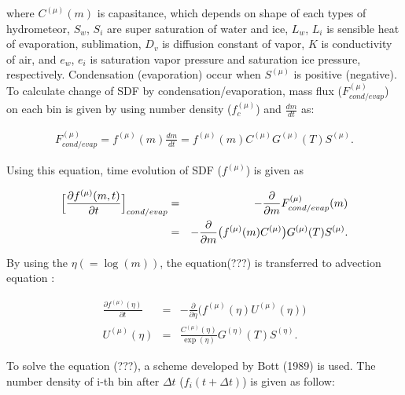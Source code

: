 where $C^{(\mu)}(m)$ is capasitance, which depends on shape of each types of hydrometeor, $S_{w}$, $S_{i}$ are super saturation of water and ice, $L_{w}$, $L_{i}$ is sensible heat of evaporation, sublimation, $D_{v}$ is diffusion constant of vapor, $K$ is conductivity of air, and $e_{w}$, $e_{i}$ is saturation vapor pressure and saturation ice pressure, respectively. Condensation (evaporation) occur when $S^{(\mu)}$ is positive (negative).\\
To calculate change of SDF by condensation/evaporation, mass flux ($F^{(\mu)}_{cond/evap}$) on each bin is given by using number density ($f_{c}^{(\mu)}$) and $\frac{dm}{dt}$ as:

\begin{eqnarray}
F^{(\mu)}_{cond/evap}=f^{(\mu)}(m)\frac{dm}{dt}=f^{(\mu)}(m)C^{(\mu)}G^{(\mu)}(T)S^{(\mu)}.
\end{eqnarray}

Using this equation, time evolution of SDF ($f^{(\mu)}$) is given as

\begin{eqnarray}
\Bigl[\frac{\partial f^{(\mu)}(m,t)}{\partial t}\Bigr]_{cond/evap}&=&-\frac{\partial}{\partial m}F^{(\mu)}_{cond/evap}(m)\nonumber\\
&=&-\frac{\partial}{\partial m}\bigl (f^{(\mu)}(m)C^{(\mu)}\bigr ) G^{(\mu)}(T)S^{(\mu)}.
\end{eqnarray}


By using the $\eta(=\log(m))$, the equation(???) is transferred to advection equation :

\begin{eqnarray}
\frac{\partial f^{(\mu)}(\eta)}{\partial t}&=&-\frac{\partial}{\partial \eta}\bigl ( f^{(\mu)}(\eta)U^{(\mu)}(\eta)\bigr)\\
U^{(\mu)}(\eta)&=&\frac{C^{(\mu)}(\eta)}{\exp (\eta)}G^{(\eta)}(T)S^{(\eta)}.\nonumber
\end{eqnarray}

To solve the equation (???), a scheme developed by Bott (1989) is used. The number density of i-th bin after $\Delta t$ ($f_{i}(t+\Delta t)$) is given as follow:

